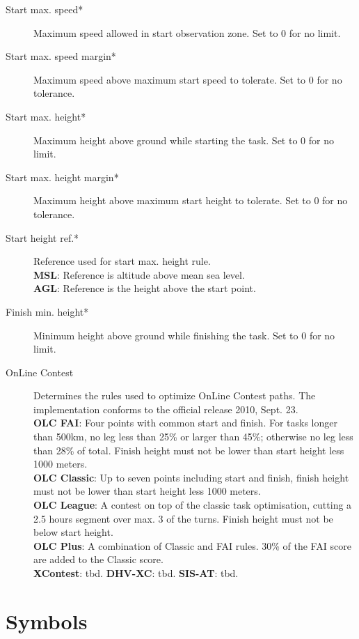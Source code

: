 \begin{description}
\item[Start max. speed*]  Maximum speed allowed in start observation zone.  Set 
  to 0 for no limit.
\item[Start max. speed margin*] Maximum speed above maximum start speed to tolerate. 
  Set to 0 for no tolerance.
\item[Start max. height*]  Maximum height above ground while starting the task. 
  Set to 0 for no limit.
\item[Start max. height margin*]  Maximum height above maximum start height to 
  tolerate.  Set to 0 for no tolerance.
\item[Start height ref.*]  Reference used for start max. height rule. \\
  {\bf MSL}: Reference is altitude above mean sea level. \\
  {\bf AGL}: Reference is the height above the start point.
\item[Finish min. height*]  Minimum height above ground while finishing the task. 
  Set to 0 for no limit. 
\item[OnLine Contest] Determines the rules used to optimize OnLine Contest 
  paths.  The implementation  conforms to the official release 2010, Sept. 23. \\
  {\bf OLC FAI}: Four points with common start and finish.  For tasks longer than
  500km, no leg less than 25\% or larger than 45\%; otherwise no leg less than 28\% 
  of total.  Finish height must not be lower than start height less 1000 meters. \\
  {\bf OLC Classic}: Up to seven points including start and finish, finish height
  must not be lower than start height less 1000 meters. \\
  {\bf OLC League}: A contest on top of the classic task optimisation, cutting
  a 2.5 hours segment over max. 3 of the turns. Finish height must not be below
  start height. \\
  {\bf OLC Plus}: A combination of Classic and FAI rules. 30\% of the FAI score
  are added to the Classic score. \\
  {\bf XContest}: tbd.
  {\bf DHV-XC}: tbd.
  {\bf SIS-AT}: tbd. 
\end{description}


\clearpage
\section{Symbols}\label{sec:symbols}

